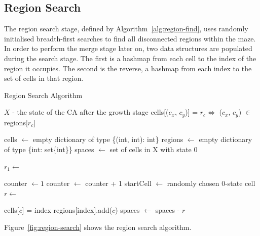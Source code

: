 \subsection{Region Search}

The region search stage, defined by Algorithm~\ref{alg:region-find}, uses randomly initialised breadth-first searches to find all disconnected regions within the maze. In order to perform the merge stage later on, two data structures are populated during the search stage. The first is a hashmap from each cell to the index of the region it occupies. The second is the reverse, a hashmap from each index to the set of cells in that region.\\

\begin{algorithm}
  \caption{Region Search Algorithm}\label{alg:region-find}
  \begin{algorithmic}
  \Require $X$ - the state of the CA after the growth stage
  \Ensure cells[($c_x$, $c_y$)] = $r_c \iff$ ($c_x$, $c_y$) $\in$ regions[$r_c$]

  \State cells $\gets$ empty dictionary of type \{(int, int): int\}
  \State regions $\gets$ empty dictionary of type \{int: set\{int\}\}
  \State spaces $\gets$ set of cells in X with state 0

  \State $r_1 \gets$ 
  \State {}
  
  \State counter $\gets 1$
    \State counter $\gets$ counter + 1
    \State startCell $\gets$ randomly chosen 0-state cell
    \State $r \gets$ 
    \State {}
  \EndWhile

        \State cells[$c$] = index
        \State regions[index].add($c$)
    \EndFor
    \State spaces $\gets$ spaces - $r$
  \EndProcedure
  \end{algorithmic}
\end{algorithm}

Figure~\ref{fig:region-search} shows the region search algorithm.\\

